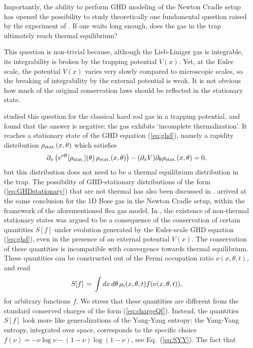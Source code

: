 \documentclass[onecolumn,amsfonts,showpacs,superscriptaddress]{revtex4-1}
\begin{document}
Importantly, the ability to perform GHD modeling of the Newton Cradle setup has opened the possibility to study theoretically one fundamental question raised by the experiment of \cite{kinoshita2006quantum}. If one waits long enough, does the gas in the trap ultimately reach thermal equilibrium?


This question is non-trivial because, although the Lieb-Liniger gas is integrable, its integrability is broken by the trapping potential $V(x)$. Yet, at the Euler scale, the potential $V(x)$ varies very slowly compared to microscopic scales, so the breaking of integrability by the external potential is weak. It is not obvious how much of the original conservation laws should be reflected in the stationary state.


\cite{cao2018incomplete} studied this question for the classical hard rod gas in a trapping potential, and found that the answer is negative: the gas exhibits `incomplete thermalization'. It reaches a stationary state of the GHD equation (\ref{eq:ghd}), namely a rapidity distribution $\rho_{\rm stat.}(x,\theta)$ which satisfies
\begin{equation}
    \label{eq:GHDstationary}
    \partial_x \left( v^{\rm eff}[\rho_{\rm stat.}](\theta) \, \rho_{\rm stat.}(x,\theta) \right) - (\partial_x V) \partial_\theta \rho_{\rm stat.}(x,\theta) = 0, 
\end{equation}
but this distribution does not need to be a thermal equilibrium distribution in the trap. The possibility of  GHD-stationary distributions of the form (\ref{eq:GHDstationary}) that are not thermal has also been discussed in \citep{doyon2017note}. \cite{caux2019hydrodynamics} arrived at the same conclusion for the 1D Bose gas in the Newton Cradle setup, within the framework of the aforementioned flea gas model. In \citep{caux2019hydrodynamics}, the existence of  non-thermal stationary states was argued to be a consequence of the conservation of certain quantities $S[f]$ under evolution generated by the Euler-scale GHD equation (\ref{eq:ghd}), even in the presence of an external potential $V(x)$. The conservation of these quantities is incompatible with convergence towards thermal equilibrium. These quantities can be constructed out of the Fermi occupation ratio $\nu(x,\theta,t)$, and read
\begin{equation}
    \label{eq:Sf_conserved}
    S[f] \, = \, \int dx \, d \theta  \, \rho_{\rm s}(x,\theta,t)  f( \nu(x,\theta,t) ) ,
\end{equation}
for arbitrary functions $f$. We stress that these quantities are different from the standard conserved charges of the form (\ref{eq:chargeQf}). Instead, the quantities $S[f]$ look more like generalizations of the Yang-Yang entropy: the Yang-Yang entropy, integrated over space, corresponds to the specific  choice $f(\nu) = -\nu \log \nu - (1-\nu) \log (1-\nu)$, see Eq.~(\ref{eq:SYY}). The fact that
\end{document}
